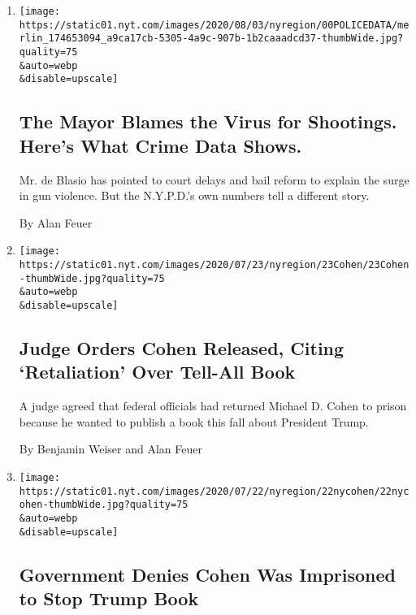 \begin{enumerate}
\def\labelenumi{\arabic{enumi}.}
\item
  \href{/2020/08/04/nyregion/nyc-shootings-coronavirus.html}{}

  \texttt{[image: https://static01.nyt.com/images/2020/08/03/nyregion/00POLICEDATA/merlin\_174653094\_a9ca17cb-5305-4a9c-907b-1b2caaadcd37-thumbWide.jpg?quality=75\\\&auto=webp\\\&disable=upscale]}

  \hypertarget{the-mayor-blames-the-virus-for-shootings-heres-what-crime-data-shows}{%
  \subsection{The Mayor Blames the Virus for Shootings. Here's What
  Crime Data
  Shows.}\label{the-mayor-blames-the-virus-for-shootings-heres-what-crime-data-shows}}

  Mr. de Blasio has pointed to court delays and bail reform to explain
  the surge in gun violence. But the N.Y.P.D.'s own numbers tell a
  different story.

  By Alan Feuer
\item
  \href{/2020/07/23/nyregion/michael-cohen-trump-book.html}{}

  \texttt{[image: https://static01.nyt.com/images/2020/07/23/nyregion/23Cohen/23Cohen-thumbWide.jpg?quality=75\\\&auto=webp\\\&disable=upscale]}

  \hypertarget{judge-orders-cohen-released-citing-retaliation-over-tell-all-book}{%
  \subsection{Judge Orders Cohen Released, Citing `Retaliation' Over
  Tell-All
  Book}\label{judge-orders-cohen-released-citing-retaliation-over-tell-all-book}}

  A judge agreed that federal officials had returned Michael D. Cohen to
  prison because he wanted to publish a book this fall about President
  Trump.

  By Benjamin Weiser and Alan Feuer
\item
  \href{/2020/07/22/nyregion/michael-cohen-donald-trump-prison.html}{}

  \texttt{[image: https://static01.nyt.com/images/2020/07/22/nyregion/22nycohen/22nycohen-thumbWide.jpg?quality=75\\\&auto=webp\\\&disable=upscale]}

  \hypertarget{government-denies-cohen-was-imprisoned-to-stop-trump-book}{%
  \subsection{Government Denies Cohen Was Imprisoned to Stop Trump
  Book}\label{government-denies-cohen-was-imprisoned-to-stop-trump-book}}


\end{enumerate}
